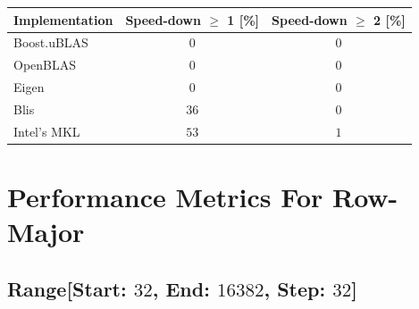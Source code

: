 \begin{table}[ht]
    \begin{tabular}{|l|c|c|}
        \hline
        \textbf{Implementation} & \textbf{Speed-down $\geq$ 1 [\%]} & \textbf{Speed-down $\geq$ 2 [\%]}\\
        \hline
        Boost.uBLAS & $0$ & $0$ \\
        \hline
        OpenBLAS    & $0$ & $0$ \\
        \hline
        Eigen       & $0$ & $0$ \\
        \hline
        Blis        & $36$ & $0$ \\
        \hline
        Intel's MKL & $53$ & $1$ \\
        \hline
    \end{tabular}
\end{table}

\clearpage
\section{Performance Metrics For Row-Major}

\subsection*{Range[Start: $32$, End: $16382$, Step: $32$]}


